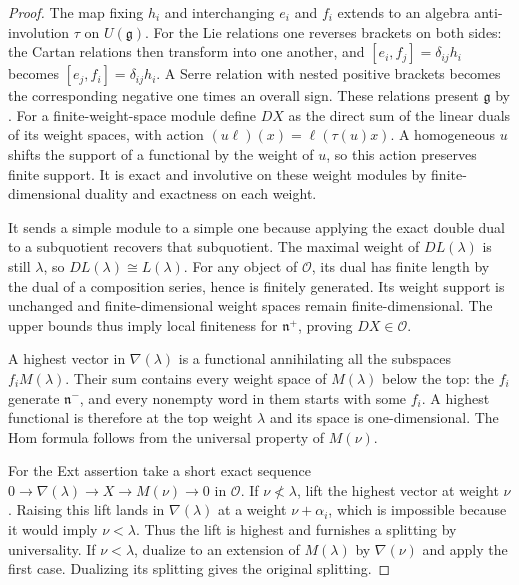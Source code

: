 \documentclass[11pt,oneside,openany]{book}
\theoremstyle{definition}
\theoremstyle{remark}
\begin{document}
\begin{proof}
The map fixing \(h_i\) and interchanging \(e_i\) and \(f_i\)
extends to an algebra anti-involution \(\tau\) on \(U(\mathfrak g)\).
For the Lie relations one reverses brackets on both sides:
the Cartan relations then transform into one another,
and \([e_i,f_j]=\delta_{ij}h_i\) becomes
\([e_j,f_i]=\delta_{ij}h_i\). A Serre relation with nested
positive brackets becomes the corresponding negative one
times an overall sign. These relations present \(\mathfrak g\)
by \cite[Results F01--F03, PDF pp.~36--38]{mg-lie}.
For a finite-weight-space module define \(DX\) as the direct
sum of the linear duals of its weight spaces, with action
\((u\ell)(x)=\ell(\tau(u)x)\). A homogeneous \(u\) shifts
the support of a functional by the weight of \(u\), so this
action preserves finite support. It is exact and involutive
on these weight modules by finite-dimensional duality and
exactness on each weight.

It sends a simple module to a simple one because applying
the exact double dual to a subquotient recovers that subquotient.
The maximal weight of \(DL(\lambda)\) is still \(\lambda\),
so \(DL(\lambda)\cong L(\lambda)\). For any object of
\(\mathcal O\), its dual has finite length by the dual of a
composition series, hence is finitely generated. Its weight
support is unchanged and finite-dimensional weight spaces
remain finite-dimensional. The upper bounds thus imply local
finiteness for \(\mathfrak n^+\), proving \(DX\in\mathcal O\).

A highest vector in \(\nabla(\lambda)\) is a functional
annihilating all the subspaces \(f_iM(\lambda)\).
Their sum contains every weight space of \(M(\lambda)\) below
the top: the \(f_i\) generate \(\mathfrak n^-\), and every
nonempty word in them starts with some \(f_i\).
A highest functional is therefore at the top weight \(\lambda\)
and its space is one-dimensional. The Hom formula follows
from the universal property of \(M(\nu)\).

For the Ext assertion take a short exact sequence
\(0\to\nabla(\lambda)\to X\to M(\nu)\to0\) in \(\mathcal O\).
If \(\nu\not<\lambda\), lift the highest vector at weight
\(\nu\). Raising this lift lands in \(\nabla(\lambda)\) at a
weight \(\nu+\alpha_i\), which is impossible because it would
imply \(\nu<\lambda\). Thus the lift is highest and furnishes
a splitting by universality. If \(\nu<\lambda\), dualize
to an extension of \(M(\lambda)\) by \(\nabla(\nu)\) and
apply the first case. Dualizing its splitting gives the
original splitting.
\end{proof}
\end{document}
